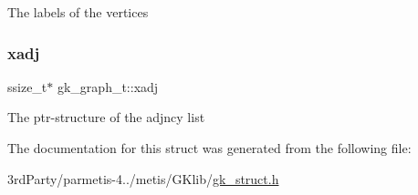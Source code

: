 The labels of the vertices \mbox{\label{structgk__graph__t_a4ab46970ef24e35f54e8ae6b3c15662f}} 
\subsubsection{\texorpdfstring{xadj}{xadj}}
{\footnotesize\ttfamily ssize\+\_\+t$\ast$ gk\+\_\+graph\+\_\+t\+::xadj}

The ptr-\/structure of the adjncy list 

The documentation for this struct was generated from the following file\+:\begin{DoxyCompactItemize}
\item 
3rd\+Party/parmetis-\/4../metis/\+G\+Klib/\hyperlink{gk__struct_8h}{gk\+\_\+struct.\+h}\end{DoxyCompactItemize}
